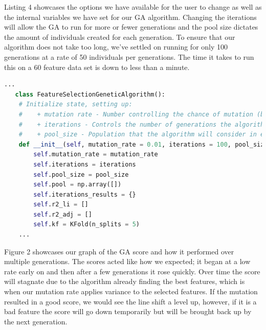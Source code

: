 \documentclass[onecolumn, draftclsnofoot,10pt, compsoc]{IEEEtran}
\begin{document}
\begin{singlespace}
Listing 4 showcases the options we have available for the user to change as well as the internal variables we have set for our GA algorithm.
Changing the iterations will allow the GA to run for more or fewer generations and the pool size dictates the amount of individuals created for each generation.
To ensure that our algorithm does not take too long, we've settled on running for only 100 generations at a rate of 50 individuals per generations.
The time it takes to run this on a 60 feature data set is down to less than a minute.

\begin{lstlisting}[language=Python, caption={Initial setup for genetic algorithm.}, label={lst:GA}, captionpos=b]
    ...
   class FeatureSelectionGeneticAlgorithm():
    # Initialize state, setting up:
    #    + mutation rate - Number controlling the chance of mutation (between 0 - 1)
    #    + iterations - Controls the number of generations the algorithm will create
    #    + pool_size - Population that the algorithm will consider in each generations
    def __init__(self, mutation_rate = 0.01, iterations = 100, pool_size = 50):
        self.mutation_rate = mutation_rate
        self.iterations = iterations
        self.pool_size = pool_size
        self.pool = np.array([])
        self.iterations_results = {}
        self.r2_li = []
        self.r2_adj = []
        self.kf = KFold(n_splits = 5)
    ...
\end{lstlisting}

Figure 2 showcases our graph of the GA score and how it performed over multiple generations.
The scores acted like how we expected; it began at a low rate early on and then after a few generations it rose quickly.
Over time the score will stagnate due to the algorithm already finding the best features, which is when our mutation rate applies variance to the selected features.
If the mutation resulted in a good score, we would see the line shift a level up, however, if it is a bad feature the score will go down temporarily but will be brought back up by the next generation.


\end{singlespace}
\end{document}
